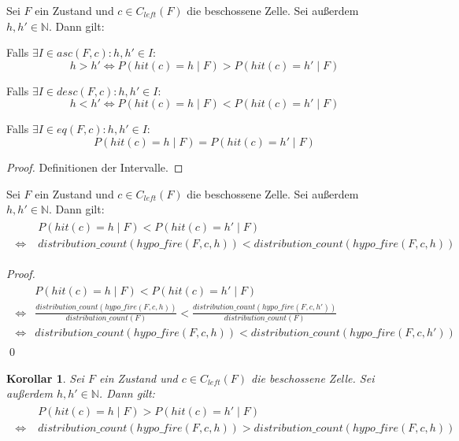 \documentclass[a4paper,12pt]{llncs}
\newcommand{\N}{{\mathbb{N}}}
\numberwithin{equation}{section}
\newtheorem{korollar}{Korollar}
\begin{document}
\begin{lemma}
Sei $F$ ein Zustand und $c \in C_{left}(F)$ die beschossene Zelle.
Sei außerdem $h,h' \in \N$.
Dann gilt:

Falls $\exists I \in asc(F, c) \colon h,h' \in I$:
\[
h > h' \Leftrightarrow P(hit(c)=h \mid F) > P(hit(c)=h' \mid F)
\]

Falls $\exists I \in desc(F, c) \colon h,h' \in I$:
\[
h < h' \Leftrightarrow P(hit(c)=h \mid F) < P(hit(c)=h' \mid F)
\]

Falls $\exists I \in eq(F, c) \colon h,h' \in I$:
\[
P(hit(c)=h \mid F) = P(hit(c)=h' \mid F)
\]

\end{lemma}

\begin{proof}
Definitionen der Intervalle.
\end{proof}

\begin{lemma}
Sei $F$ ein Zustand und $c \in C_{left}(F)$ die beschossene Zelle.
Sei außerdem $h,h' \in \N$.
Dann gilt:
\begin{align}
\begin{split}
&P(hit(c)=h \mid F) < P(hit(c)=h' \mid F) \\
\Leftrightarrow \; &distribution\_count(hypo\_fire(F, c, h)) < distribution\_count(hypo\_fire(F, c, h))
\nonumber
\end{split}
\end{align}
\end{lemma}

\begin{proof}
\begin{align}
\begin{split}
&P(hit(c)=h \mid F) < P(hit(c)=h' \mid F) \\
\Leftrightarrow
&\frac{distribution\_count(hypo\_fire(F,c, h))}{distribution\_count(F)} < \frac{distribution\_count(hypo\_fire(F,c, h'))}{distribution\_count(F)} \\
\Leftrightarrow
&distribution\_count(hypo\_fire(F,c, h)) < distribution\_count(hypo\_fire(F,c, h'))
\nonumber
\end{split}
\end{align}
\qed
\end{proof}

\begin{korollar}
Sei $F$ ein Zustand und $c \in C_{left}(F)$ die beschossene Zelle.
Sei außerdem $h,h' \in \N$.
Dann gilt:
\begin{align}
\begin{split}
&P(hit(c)=h \mid F) > P(hit(c)=h' \mid F) \\
\Leftrightarrow \; &distribution\_count(hypo\_fire(F, c, h)) > distribution\_count(hypo\_fire(F, c, h))
\nonumber
\end{split}
\end{align}
\end{korollar}
\end{document}
